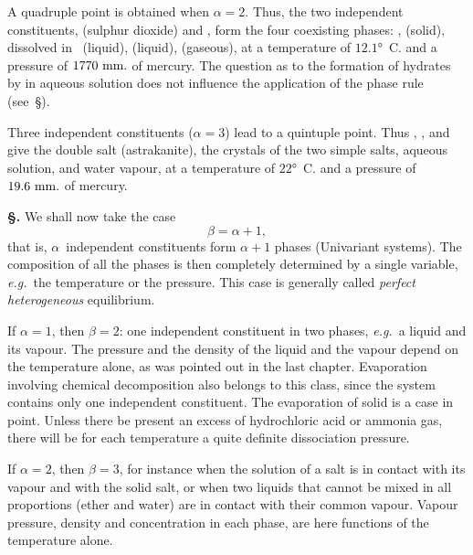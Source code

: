 \documentclass[12pt]{book}[2005/09/16]
\newcommand{\Typo}[2]{#2}
\newcommand{\Erratum}[2]{#2}
\newcommand{\Section}[1]{
  \medskip\par\textbf{§\;#1}
  \label{section:#1}
}
\newcommand{\SecRef}[2][§\;]{\hyperref[section:#2.]{{\upshape #1#2}}}
\newcommand{\PageSep}[1]{\ignorespaces}
\newcommand{\eg}{\emph{e.g.}}
\newcommand{\Unit}[1]{\text{\upshape #1}}
\begin{document}
A quadruple point is obtained when $\alpha = 2$. Thus, the
%
two independent constituents,  (sulphur dioxide) and
, form the four coexisting phases: ,  (solid), 
dissolved in~ (liquid),  (liquid),  (gaseous), at a
temperature of $12.1°$~C. and a pressure of $1770~\Unit{mm.}$ of mercury.
The question as to the formation of hydrates by 
in aqueous solution does not influence the application of the
phase rule (see~\SecRef{198}).

Three independent constituents ($\alpha = 3$) lead to a \Erratum{quintiple}{quintuple}
\Erratum{\index{Point!quintiple}\index{Quintiple point}}{\index{Point!quintuple}}%
point. Thus , , and  give the double
salt  (astrakanite), the crystals of the
two simple salts, aqueous solution, and water vapour, at a
temperature of $22°$~C. and a pressure of $19.6~\Unit{mm.}$ of mercury.

\Section{206.} We shall now take the case
%
%
\[
\beta = \alpha + 1,
\]
that is, $\alpha$~independent constituents form $\alpha + 1$ phases
(Univariant systems). The composition of all the phases is
then completely determined by a single variable, \eg\ the
temperature or the pressure. This case is generally called
\emph{perfect heterogeneous} equilibrium.

If $\alpha = 1$, then $\beta = 2$: one independent constituent in
two phases, \eg\ a liquid and its vapour. The pressure and
the density of the liquid and the vapour depend on the
temperature alone, as was pointed out in the last chapter.
\PageSep{181}
Evaporation involving chemical decomposition also belongs
to this class, since the system contains only one independent
constituent. The evaporation of solid \Typo{.}{} is a case in
point. Unless there be present an excess of hydrochloric
acid or ammonia gas, there will be for each temperature a
quite definite dissociation pressure.

If $\alpha = 2$, then $\beta = 3$, for instance when the solution of a
salt is in contact with its vapour and with the solid salt, or
when two liquids that cannot be mixed in all proportions
(ether and water) are in contact with their common vapour.
Vapour pressure, density and concentration in each phase,
are here functions of the temperature alone.
\end{document}

